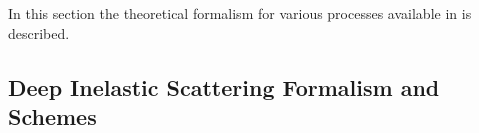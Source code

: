 
\def\kt{\ensuremath{k_t}}
\newcommand{\Pmax}{p}
\newcommand{\CCFM}{CCFMa,CCFMb,Catani:1989sg,CCFMd}


%
In this section the theoretical formalism for various processes available in \fitter is described.



\subsection{Deep Inelastic Scattering Formalism and Schemes}
\label{dissection}


